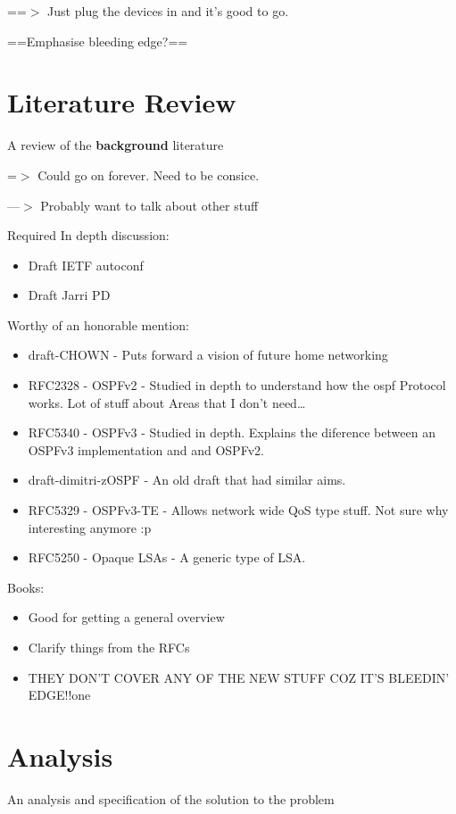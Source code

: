 \documentclass[12pt]{report}
\begin{document}
==$>$ Just plug the devices in and it's good to go. 

==Emphasise bleeding edge?==

\chapter{Literature Review} 
A review of the \textbf{background} literature

=$>$ Could go on forever. Need to be consice. 

---$>$ Probably want to talk about other stuff

Required In depth discussion:
\begin{itemize}
\item Draft IETF autoconf 
\item Draft Jarri PD
\end{itemize}

Worthy of an honorable mention:

\begin{itemize}
\item draft-CHOWN - Puts forward a vision of future home networking
\item RFC2328 - OSPFv2 - Studied in depth to understand how the ospf Protocol works. Lot of stuff about Areas that I don't need\ldots
\item RFC5340 - OSPFv3 - Studied in depth. Explains the diference between an OSPFv3 implementation and and OSPFv2.
\item draft-dimitri-zOSPF - An old draft that had similar aims.
\item RFC5329 - OSPFv3-TE - Allows network wide QoS type stuff. Not sure why interesting anymore :p
\item RFC5250 - Opaque LSAs - A generic type of LSA. 
\end{itemize}

Books:

\begin{itemize}
\item Good for getting a general overview
\item Clarify things from the RFCs 
\item THEY DON'T COVER ANY OF THE NEW STUFF COZ IT'S BLEEDIN' EDGE!!one
\end{itemize}

\chapter{Analysis}
An analysis and specification of the solution to the problem
\end{document}
